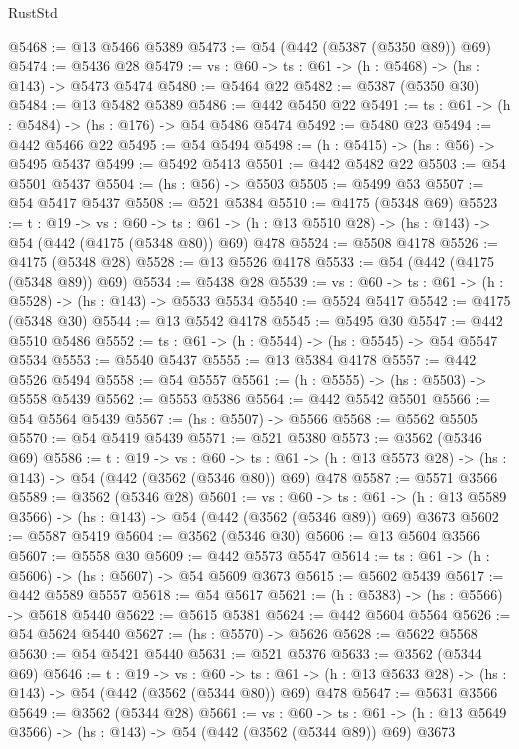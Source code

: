 \begin{lexlean}{RustStd}
\begin{coremodule}
@5468 := @13 @5466 @5389
@5473 := @54 (@442 (@5387 (@5350 @89)) @69)
@5474 := @5436 @28
@5479 := {vs : @60} -> {ts : @61} -> (h : @5468) -> (hs : @143) -> @5473 @5474
@5480 := @5464 @22
@5482 := @5387 (@5350 @30)
@5484 := @13 @5482 @5389
@5486 := @442 @5450 @22
@5491 := {ts : @61} -> (h : @5484) -> (hs : @176) -> @54 @5486 @5474
@5492 := @5480 @23
@5494 := @442 @5466 @22
@5495 := @54 @5494
@5498 := (h : @5415) -> (hs : @56) -> @5495 @5437
@5499 := @5492 @5413
@5501 := @442 @5482 @22
@5503 := @54 @5501 @5437
@5504 := (hs : @56) -> @5503
@5505 := @5499 @53
@5507 := @54 @5417 @5437
@5508 := @521 @5384
@5510 := @4175 (@5348 @69)
@5523 := {t : @19} ->
  {vs : @60} ->
  {ts : @61} -> (h : @13 @5510 @28) -> (hs : @143) -> @54 (@442 (@4175 (@5348 @80)) @69) @478
@5524 := @5508 @4178
@5526 := @4175 (@5348 @28)
@5528 := @13 @5526 @4178
@5533 := @54 (@442 (@4175 (@5348 @89)) @69)
@5534 := @5438 @28
@5539 := {vs : @60} -> {ts : @61} -> (h : @5528) -> (hs : @143) -> @5533 @5534
@5540 := @5524 @5417
@5542 := @4175 (@5348 @30)
@5544 := @13 @5542 @4178
@5545 := @5495 @30
@5547 := @442 @5510 @5486
@5552 := {ts : @61} -> (h : @5544) -> (hs : @5545) -> @54 @5547 @5534
@5553 := @5540 @5437
@5555 := @13 @5384 @4178
@5557 := @442 @5526 @5494
@5558 := @54 @5557
@5561 := (h : @5555) -> (hs : @5503) -> @5558 @5439
@5562 := @5553 @5386
@5564 := @442 @5542 @5501
@5566 := @54 @5564 @5439
@5567 := (hs : @5507) -> @5566
@5568 := @5562 @5505
@5570 := @54 @5419 @5439
@5571 := @521 @5380
@5573 := @3562 (@5346 @69)
@5586 := {t : @19} ->
  {vs : @60} ->
  {ts : @61} -> (h : @13 @5573 @28) -> (hs : @143) -> @54 (@442 (@3562 (@5346 @80)) @69) @478
@5587 := @5571 @3566
@5589 := @3562 (@5346 @28)
@5601 := {vs : @60} ->
  {ts : @61} -> (h : @13 @5589 @3566) -> (hs : @143) -> @54 (@442 (@3562 (@5346 @89)) @69) @3673
@5602 := @5587 @5419
@5604 := @3562 (@5346 @30)
@5606 := @13 @5604 @3566
@5607 := @5558 @30
@5609 := @442 @5573 @5547
@5614 := {ts : @61} -> (h : @5606) -> (hs : @5607) -> @54 @5609 @3673
@5615 := @5602 @5439
@5617 := @442 @5589 @5557
@5618 := @54 @5617
@5621 := (h : @5383) -> (hs : @5566) -> @5618 @5440
@5622 := @5615 @5381
@5624 := @442 @5604 @5564
@5626 := @54 @5624 @5440
@5627 := (hs : @5570) -> @5626
@5628 := @5622 @5568
@5630 := @54 @5421 @5440
@5631 := @521 @5376
@5633 := @3562 (@5344 @69)
@5646 := {t : @19} ->
  {vs : @60} ->
  {ts : @61} -> (h : @13 @5633 @28) -> (hs : @143) -> @54 (@442 (@3562 (@5344 @80)) @69) @478
@5647 := @5631 @3566
@5649 := @3562 (@5344 @28)
@5661 := {vs : @60} ->
  {ts : @61} -> (h : @13 @5649 @3566) -> (hs : @143) -> @54 (@442 (@3562 (@5344 @89)) @69) @3673

\end{coremodule}
\end{lexlean}
